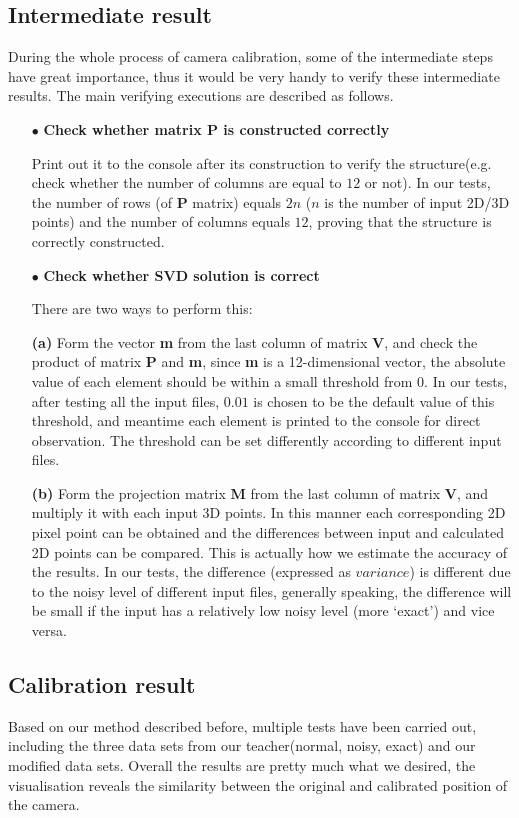 \documentclass[a4paper]{article}
\begin{document}
\subsection{Intermediate result}
During the whole process of camera calibration, some of the intermediate steps have great importance, thus it would be very handy to verify these intermediate results. The main verifying executions are described as follows.
\begin{itemize}
\item[$\bullet$] \textbf{Check whether matrix P is constructed correctly}

Print out it to the console after its construction to verify the structure(e.g. check whether the number of columns are equal to $12$ or not). In our tests, the number of rows (of \textbf{P} matrix) equals $2n$ ($n$ is the number of input 2D/3D points) and the number of columns equals $12$, proving that the structure is correctly constructed.

\item[$\bullet$] \textbf{Check whether SVD solution is correct}

There are two ways to perform this:

\textbf{(a)} Form the vector \textbf{m} from the last column of matrix \textbf{V}, and check the product of matrix \textbf{P} and \textbf{m}, since \textbf{m} is a 12-dimensional vector, the absolute value of each element should be within a small threshold from 0. In our tests, after testing all the input files, $0.01$ is chosen to be the default value of this threshold, and meantime each element is printed to the console for direct observation. The threshold can be set differently according to different input files.

\textbf{(b)} Form the projection matrix \textbf{M} from the last column of matrix \textbf{V}, and multiply it with each input 3D points. In this manner each corresponding 2D pixel point can be obtained and the differences between input and calculated 2D points can be compared. This is actually how we estimate the accuracy of the results. In our tests, the difference (expressed as $variance$) is different due to the noisy level of different input files, generally speaking, the difference will be small if the input has a relatively low noisy level (more `exact') and vice versa.

\end{itemize}

\subsection{Calibration result}
Based on our method described before, multiple tests have been carried out, including the three data sets from our teacher(normal, noisy, exact) and our modified data sets. Overall the results are pretty much what we desired, the visualisation reveals the similarity between the original and calibrated position of the camera.
\end{document}

